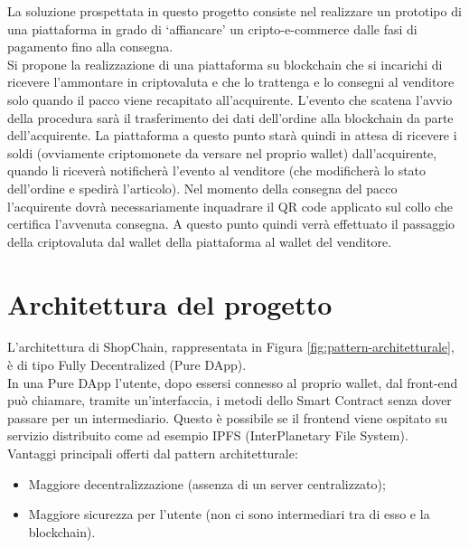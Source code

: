 La soluzione prospettata in questo progetto consiste nel realizzare un prototipo di una piattaforma in grado di ‘affiancare’ un cripto-e-commerce dalle fasi di pagamento fino alla consegna.\\
Si propone la realizzazione di una piattaforma su blockchain che si incarichi di ricevere l’ammontare in criptovaluta e che lo trattenga e lo consegni al venditore solo quando il pacco viene recapitato all’acquirente. L’evento che scatena l’avvio della procedura sarà il trasferimento dei dati dell’ordine alla blockchain da parte dell’acquirente. La piattaforma a questo punto starà quindi in attesa di ricevere i soldi (ovviamente criptomonete da versare nel proprio wallet) dall’acquirente, quando li riceverà notificherà l’evento al venditore (che modificherà lo stato dell’ordine e spedirà l’articolo). Nel momento della consegna del pacco l’acquirente dovrà necessariamente inquadrare il QR code applicato sul collo che certifica l’avvenuta consegna. A questo punto quindi verrà effettuato il passaggio della criptovaluta dal wallet della piattaforma al wallet del venditore.\\

\newpage
\section{Architettura del progetto}
L’architettura di ShopChain, rappresentata in Figura \ref{fig:pattern-architetturale}, è di tipo Fully Decentralized (Pure DApp).\\
In una Pure DApp l'utente, dopo essersi connesso al proprio wallet, dal front-end può chiamare, tramite un'interfaccia, i metodi dello Smart Contract senza dover passare per un intermediario.
Questo è possibile se il frontend viene ospitato su servizio distribuito come ad esempio IPFS (InterPlanetary File System).\cite{site:ipfs}\\[0.2cm]
Vantaggi principali offerti dal pattern architetturale:
\begin{itemize}
    \item Maggiore decentralizzazione (assenza di un server centralizzato);
    \item Maggiore sicurezza per l'utente (non ci sono intermediari tra di esso e la blockchain).
\end{itemize}

